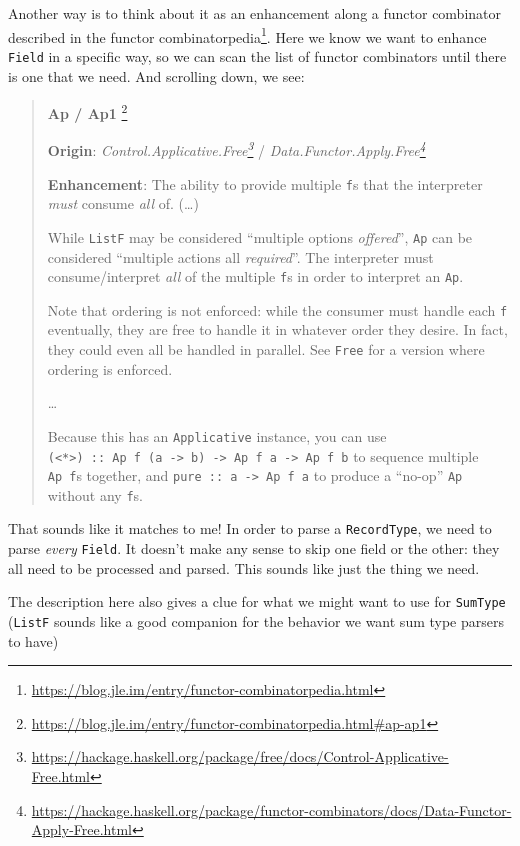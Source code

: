 \documentclass[]{article}
\renewcommand{\href}[2]{#2\footnote{\url{#1}}}
\begin{document}
Another way is to think about it as an enhancement along a functor combinator
described in the
\href{https://blog.jle.im/entry/functor-combinatorpedia.html}{functor
combinatorpedia}. Here we know we want to enhance \texttt{Field} in a specific
way, so we can scan the list of functor combinators until there is one that we
need. And scrolling down, we see:

\begin{quote}
\href{https://blog.jle.im/entry/functor-combinatorpedia.html\#ap-ap1}{\textbf{Ap
/ Ap1 }}

\textbf{Origin}:
\emph{\href{https://hackage.haskell.org/package/free/docs/Control-Applicative-Free.html}{Control.Applicative.Free}}
/
\emph{\href{https://hackage.haskell.org/package/functor-combinators/docs/Data-Functor-Apply-Free.html}{Data.Functor.Apply.Free}}

\textbf{Enhancement}: The ability to provide multiple \texttt{f}s that the
interpreter \emph{must} consume \emph{all} of. (\ldots)

While \texttt{ListF} may be considered ``multiple options \emph{offered}'',
\texttt{Ap} can be considered ``multiple actions all \emph{required}''. The
interpreter must consume/interpret \emph{all} of the multiple \texttt{f}s in
order to interpret an \texttt{Ap}.

Note that ordering is not enforced: while the consumer must handle each
\texttt{f} eventually, they are free to handle it in whatever order they desire.
In fact, they could even all be handled in parallel. See \texttt{Free} for a
version where ordering is enforced.

\ldots{}

Because this has an \texttt{Applicative} instance, you can use
\texttt{(\textless{}*\textgreater{})\ ::\ Ap\ f\ (a\ -\textgreater{}\ b)\ -\textgreater{}\ Ap\ f\ a\ -\textgreater{}\ Ap\ f\ b}
to sequence multiple \texttt{Ap\ f}s together, and
\texttt{pure\ ::\ a\ -\textgreater{}\ Ap\ f\ a} to produce a ``no-op''
\texttt{Ap} without any \texttt{f}s.
\end{quote}

That sounds like it matches to me! In order to parse a \texttt{RecordType}, we
need to parse \emph{every} \texttt{Field}. It doesn't make any sense to skip one
field or the other: they all need to be processed and parsed. This sounds like
just the thing we need.

The description here also gives a clue for what we might want to use for
\texttt{SumType} (\texttt{ListF} sounds like a good companion for the behavior
we want sum type parsers to have)
\end{document}
